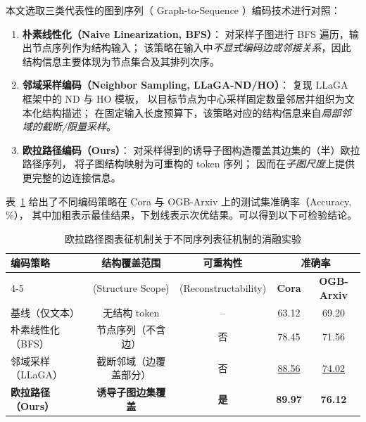 本文选取三类代表性的图到序列（ Graph-to-Sequence ）编码技术进行对照：
\begin{enumerate}
  \item \textbf{朴素线性化（Naive Linearization, BFS）}：
  对采样子图进行 BFS 遍历，输出节点序列作为结构输入；
  该策略在输入中\emph{不显式编码边或邻接关系}，因此结构信息主要体现为节点集合及其排列次序。

  \item \textbf{邻域采样编码（Neighbor Sampling, LLaGA-ND/HO）}：
  复现 LLaGA\cite{Chen2024LLaGALL} 框架中的 ND 与 HO 模板，
  以目标节点为中心采样固定数量邻居并组织为文本化结构描述；
  在固定输入长度预算下，该策略对应的结构信息来自\emph{局部邻域的截断/限量采样}。

  \item \textbf{欧拉路径编码（Ours）}：
  对采样得到的诱导子图构造覆盖其边集的（半）欧拉路径序列，
  将子图结构映射为可重构的 token 序列；
  因而在\emph{子图尺度}上提供更完整的边连接信息。
\end{enumerate}

表~\ref{tab:ablation_encoding} 给出了不同编码策略在 Cora 与 
OGB-Arxiv 上的测试集准确率（Accuracy, \%），
其中加粗表示最佳结果，下划线表示次优结果。可以得到以下可检验结论。

\begin{table}[htbp]
  \centering
  \small
  \caption{欧拉路径图表征机制关于不同序列表征机制的消融实验}
  \label{tab:ablation_encoding}
  \setlength{\tabcolsep}{8pt}
  \renewcommand{\arraystretch}{1.2}
  \begin{tabular}{lcccc}
    \toprule
    \multirow{2}{*}{\textbf{编码策略}} & \textbf{结构覆盖范围}
    & \textbf{可重构性} & \multicolumn{2}{c}{\textbf{准确率}} \\
    \cmidrule(lr){4-5}
    & (Structure Scope) & (Reconstructability) & \textbf{Cora} & \textbf{OGB-Arxiv} \\
    \midrule
    基线（仅文本） & 无结构 token & -- & 63.12 & 69.20 \\
    朴素线性化（BFS） & 节点序列（不含边） & 否 & 78.45 & 71.56 \\
    邻域采样（LLaGA） & 截断邻域（边覆盖部分） & 否 & \underline{88.56} & \underline{74.02} \\
    \textbf{欧拉路径（Ours）} & \textbf{诱导子图边集覆盖} & \textbf{是} & \textbf{89.97} & \textbf{76.12} \\
    \bottomrule
  \end{tabular}
\end{table}



